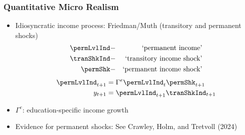 \documentclass[pdflatex,aspectratio=169, handout]{beamer}
\renewcommand{\PermGroFac}{\Gamma}
\begin{document}
\begin{frame}
  \frametitle{Quantitative Micro Realism}
\begin{itemize}
	\itemsep = \bigskipamount 
	\item Idiosyncratic income process: Friedman/Muth (transitory and permanent shocks)
  \providecommand{\permLvl}{}\renewcommand{\permLvl}{\permLvlInd}
  \begin{eqnarray*}
    \permLvlInd & - & \text{`permanent income'} \\
\tranShkInd & - & \text{`transitory income shock'}  \\
    \permShk & - & \text{`permanent income shock'}
  \end{eqnarray*}
  \begin{equation*}\begin{gathered}\begin{aligned}
    \permLvlInd_{t+1} & = \PermGroFac^{e} \permLvlInd_{t} \permShk_{t+1} \\
    y_{t+1} &= \permLvlInd_{t+1}\tranShkInd_{t+1} \\
  \end{aligned}\end{gathered}
\end{equation*}

\item $\PermGroFac^{e}$: education-specific income growth
\item Evidence for permanent shocks: See Crawley, Holm, and Tretvoll (2024)
\end{itemize}
\end{frame}

%
\end{document}
